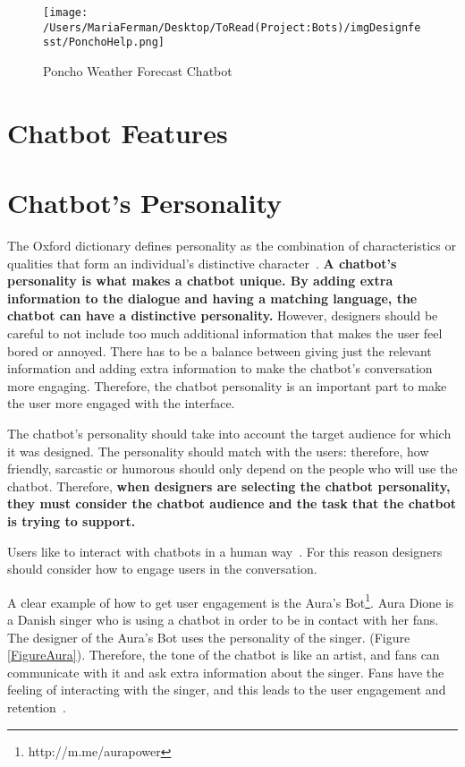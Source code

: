 \documentclass[a4paper,10pt]{article}
\begin{document}
\begin{figure}
\centering
\texttt{[image: /Users/MariaFerman/Desktop/ToRead(Project:Bots)/imgDesignfesst/PonchoHelp.png]}
\caption{Poncho Weather Forecast Chatbot}
\label{FigureCommunicationCapabilities}
\end{figure}

\section*{Chatbot Features}

\section{Chatbot's Personality}

The Oxford dictionary defines personality as the combination of characteristics or qualities that form an individual's distinctive character~\cite{Oxford}. \textbf{A chatbot’s personality is what makes a chatbot unique. By adding extra information to the dialogue and having a matching language, the chatbot can have a distinctive personality.} However, designers should be careful to not include too much additional information that makes the user feel bored or annoyed. There has to be a balance between giving just the relevant information and adding extra information to make the chatbot's conversation more engaging. Therefore, the chatbot personality is an important part to make the user more engaged with the interface.

The chatbot’s personality should take into account the target audience for which it was designed. The personality should match with the users: therefore, how friendly, sarcastic or humorous should only depend on the people who will use the chatbot. Therefore, \textbf{when designers are selecting the chatbot personality, they must consider the chatbot audience and the task that the chatbot is trying to support.}  

Users like to interact with chatbots in a human way~\cite{HeuristicsWebPage}. For this reason designers should consider how to engage users in the conversation. 

A clear example of how to get user engagement is the Aura's Bot\footnote{http://m.me/aurapower}. Aura Dione is a Danish singer who is using a chatbot in order to be in contact with her fans. The designer of the Aura's Bot uses the personality of the singer. (Figure \ref{FigureAura}). Therefore, the tone of the chatbot is like an artist, and fans can communicate with it and ask extra information about the singer. Fans have the feeling of interacting with the singer, and this leads to the user engagement and retention~\cite{personality}.  
\end{document}
